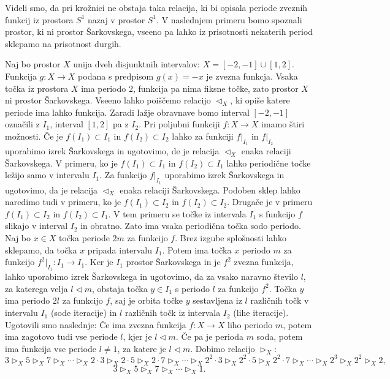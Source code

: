 \documentclass[mat2]{fmfdelo}
\begin{document}
Videli smo, da pri krožnici ne obstaja taka relacija, ki bi opisala periode zveznih funkcij iz prostora $S^1$ nazaj v prostor $S^1$. V naslednjem primeru bomo spoznali prostor, ki ni prostor Šarkovskega, vseeno pa lahko iz prisotnosti nekaterih period sklepamo na prisotnost durgih.
\begin{primer}
Naj bo prostor $X$ unija dveh disjunktnih intervalov: $X = [-2, -1] \cup [1, 2]$. Funkcija $g : X \to X$ podana s predpisom $g(x) = -x$ je zvezna funkcja. Vsaka točka iz prostora $X$ ima periodo 2, funkcija pa nima fiksne točke, zato prostor $X$ ni prostor Šarkovskega. Vseeno lahko poiščemo relacijo $\triangleleft_X$, ki opiše katere periode ima lahko funkcija. Zaradi lažje obravnave bomo interval $[-2, -1]$ označili z $I_1$, interval $[1, 2]$ pa z $I_2$. Pri poljubni funkciji $f: X \to X$ imamo štiri možnosti. Če je $f(I_1) \subset I_1$ in $f(I_2) \subset I_2$ lahko za funkciji $f|_{I_1}$ in $f|_{I_2}$ uporabimo izrek Šarkovskega in ugotovimo, de je relacija $\triangleleft_X$ enaka relaciji Šarkovskega. V primeru, ko je $f(I_1) \subset I_1$ in $f(I_2) \subset I_1$ lahko periodične točke ležijo samo v intervalu $I_1$. Za funkcijo $f|_{I_1}$ uporabimo izrek Šarkovskega in ugotovimo, da je relacija $\triangleleft_X$ enaka relaciji Šarkovskega. Podoben sklep lahko naredimo tudi v primeru, ko je $f(I_1) \subset I_2$ in $f(I_2) \subset I_2$. Drugače je v primeru $f(I_1) \subset I_2$ in $f(I_2) \subset I_1$. V tem primeru se točke iz intervala $I_1$ s funkcijo $f$ slikajo v interval $I_2$ in obratno. Zato ima vsaka periodična točka sodo periodo. Naj bo $x \in X$ točka periode $2m$ za funkcijo $f$. Brez izgube splošnosti lahko sklepamo, da točka $x$ pripada intervalu $I_1$. Potem ima točka $x$ periodo $m$ za funkcijo $f^2|_{I_1} :I_1 \to I_1$. Ker je $I_1$ prostor Šarkovskega in je $f^2$ zvezna funkcija, lahko uporabimo izrek Šarkovskega in ugotovimo, da za vsako naravno število $l$, za katerega velja $l \triangleleft m$, obstaja točka $y \in I_1$ s periodo $l$ za funkcijo $f^2$. Točka $y$ ima periodo $2l$ za funkcijo $f$, saj je orbita točke $y$ sestavljena iz $l$ različnih točk v intervalu $I_1$ (sode iteracije) in $l$ različnih točk iz intervala $I_2$ (lihe iteracije). 
Ugotovili smo naslednje: Če ima zvezna funkcija $f:X \to X$ liho periodo $m$, potem ima zagotovo tudi vse periode $l$, kjer je $l \triangleleft m$. Če pa je perioda $m$ soda, potem ima funkcija vse periode $l\neq1$, za katere je $l \triangleleft m$. 
Dobimo relacijo $\triangleright_X$:
$$3 \triangleright_X 5 \triangleright_X 7 \triangleright_X \cdots \triangleright_X 2\cdot 3 \triangleright_X 2\cdot 5 \triangleright_X 2\cdot 7 \triangleright_X \cdots \triangleright_X 2^2\cdot 3 \triangleright_X 2^2\cdot 5 \triangleright_X 2^2\cdot 7 \triangleright_X \cdots \triangleright_X 2^3 \triangleright_X 2^2 \triangleright_X 2,$$
$$3 \triangleright_X 5 \triangleright_X 7 \triangleright_X \cdots \triangleright_X 1.$$
\end{primer}
\end{document}
